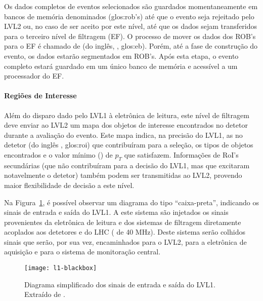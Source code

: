 Os dados completos de eventos selecionados são guardados momentaneamente em
bancos de memória denominados  (\gls{glos:rob}'s) até que
o evento seja rejeitado pelo LVL2 ou, no caso de ser aceito por este nível,
até que os dados sejam transferidos para o terceiro nível de filtragem (EF). O
processo de mover os dados dos ROB's para o EF é chamado de  (do inglês, , \gls{glos:eb}). Porém, até a fase de
construção do evento, os dados estarão segmentados em ROB's. Após esta etapa,
o evento completo estará guardado em um único banco de memória e acessível a
um processador do EF. 

\paragraph{Regiões de Interesse} Além do disparo dado pelo LVL1 à eletrônica de
leitura, este nível de filtragem deve enviar ao LVL2 um mapa dos objetos de
interesse encontrados no detetor durante a avaliação do evento. Este mapa
indica, na precisão do LVL1, as  no detetor (do inglês
, \gls{glos:roi}) que contribuíram para a seleção, os tipos
de objetos encontrados e o valor mínimo () de $p_T$ que
satisfazem. Informações de RoI's secundárias (que não contribuíram para a
decisão do LVL1, mas que excitaram notavelmente o detetor) também podem ser
transmitidas ao LVL2, provendo maior flexibilidade de decisão a este nível.

Na Figura~\ref{fig:l1-context}, é possível observar um diagrama do tipo
``caixa-preta'', indicando os sinais de entrada e saída do LVL1. A este
sistema são injetados os sinais provenientes da eletrônica de leitura e dos
sistemas de filtragem diretamente acoplados aos detetores e do LHC
( de 40 MHz). Deste sistema serão colhidos sinais que serão, por
sua vez, encaminhados para o LVL2, para a eletrônica de aquisição e para o
sistema de monitoração central.

\begin{figure}
\begin{center}
\texttt{[image: l1-blackbox]}
\end{center}
\caption[Diagrama simplificado dos sinais de entrada e saída do
LVL1.]{Diagrama simplificado dos sinais de entrada e saída do
LVL1. Extraído de \cite{hlt-tdr}.}
\label{fig:l1-context}
\end{figure}

